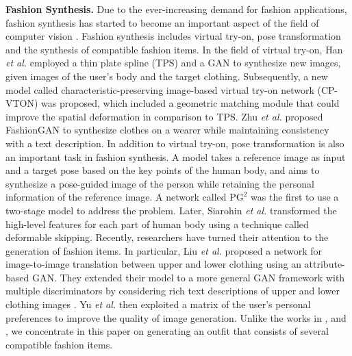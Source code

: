 \textbf{Fashion Synthesis.} Due to the ever-increasing demand for fashion applications, fashion synthesis has started to become an important aspect of the field of computer vision \cite{2020arXiv200313988C}. Fashion synthesis includes virtual try-on, pose transformation and the synthesis of compatible fashion items. In the field of virtual try-on, Han \textit{et al.} \cite{Han_2018_viton} employed a thin plate spline (TPS) and a GAN to synthesize new images, given images of the user's body and the target clothing. Subsequently, a new model called characteristic-preserving image-based virtual try-on network (CP-VTON) \cite{cp_vton} was proposed, which included a geometric matching module that could improve the spatial deformation in comparison to TPS. Zhu \textit{et al.} \cite{fashion_gan} proposed FashionGAN to synthesize clothes on a wearer while maintaining consistency with a text description. In addition to virtual try-on, pose transformation is also an important task in fashion synthesis. A model takes a reference image as input and a target pose based on the key points of the human body, and aims to synthesize a pose-guided image of the person while retaining the personal information of the reference image. A network called $\mathrm{PG}^2$ \cite{ma2017pose} was the first to use a two-stage model to address the problem. Later, Siarohin \textit{et al.} \cite{siarohin2018deformable} transformed the high-level features for each part of human body using a technique called deformable skipping. Recently, researchers have turned their attention to the generation of fashion items. In particular, Liu \textit{et al.} \cite{attribute_gan} proposed a network for image-to-image translation between upper and lower clothing using an attribute-based GAN. They extended their model to a more general GAN framework with multiple discriminators by considering rich text descriptions of upper and lower clothing images \cite{multi_dis_fashion}. Yu \textit{et al.} \cite{Yu_2019_ICCV} then exploited a matrix of the user's personal preferences to improve the quality of image generation. Unlike the works in \cite{attribute_gan}, \cite{multi_dis_fashion} and \cite{Yu_2019_ICCV}, we concentrate in this paper on generating an outfit that consists of several compatible fashion items.

